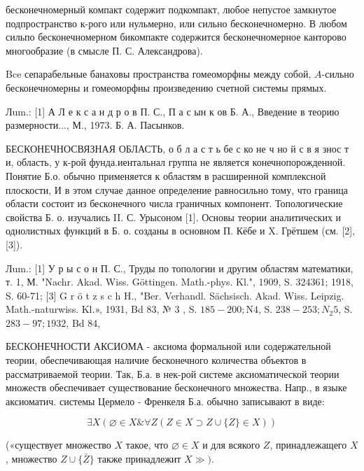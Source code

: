 \documentclass[10pt]{article}
\begin{document}
бесконечномерный компакт содержит подкомпакт, любое непустое замкнутое подпространство к-рого или нульмерно, или сильно бесконечномерно. В любом сильпо бесконечномерном бикомпакте содержится бесконечномерное канторово многообразие (в смысле П. С. Александрова).



Bce сепарабельные банаховы пространства гомеоморфны между собой, $A$-сильно бесконечномерны и гомеоморфны произведению счетной системы прямых.



Лum.: [1] А Л е к с а н д р о в П. С., П а с ын к ов Б. А., Введение в теорию размерности..., М., 1973. Б. А. Пасынков.



БЕСКОНЕЧНОСВЯЗНАЯ ОБЛАСТЬ, $о$ б л а с т ь бе с ко не ч но й с в я знос т и, область, у к-рой фунда.иентальнал группа не является конечнопорожденной. Понятие Б.о. обычно применяется к областям в расширенной комплексной плоскости, И в этом случае данное определение равносильно тому, что граница области состоит из бесконечного числа граничных компонент. Топологические свойства Б. о. изучались II. С. Урысоном [1]. Основы теории аналитических и однолистных функций в Б. о. созданы в основном П. Кёбе и X. Грётшем (см. [2], [3]).



Лum.: [1] У р ы с о н П. С., Труды по топологии и другим областям математики, т. 1, М. "Nachr. Akad. Wiss. Göttingen. Math.-phys. Kl.", 1909, S. 324361; 1918, S. 60-71; [3] G r ö t z s c h H., "Ber. Verhandl. Sächsisch. Akad. Wiss. Leipzig. Math.-naturwiss. Kl.», 1931, Bd 83, № 3 , S. $185-200 ; \mathrm{N} \mathrm{4}$, S. $238-253 ; N_{2} 5$, S. $283-97 ; 1932$, Bd 84,



БЕСКОНЕЧНОСТИ АКСИОМА - аксиома формальной или содержательной теории, обеспечивающая наличие бесконечного количества объектов в рассматриваемой теории. Так, Б.а. в нек-рой системе аксиоматической теории множеств обеспечивает существование бесконечного множества. Напр., в языке аксиоматич. системы Цермело - Френкеля Б.а. обычно записывают в виде:



\[

\exists X(\varnothing \in X \& \forall Z(Z \in X \supset Z \cup\{Z\} \in X))

\]



(«существует множество $X$ такое, что $\varnothing \in X$ и для всякого $Z$, принадлежащего $X$, множество $Z \cup\{\bar{Z}\}$ также принадлежит $X \gg)$.
\end{document}
